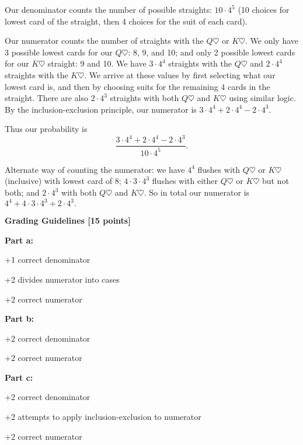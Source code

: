 \documentclass[12pt]{exam}
\begin{document}
\begin{solution}
\begin{qparts}
    \item Our denominator counts the number of possible straights: $10 \cdot 4^5$ (10 choices for lowest card of the straight, then 4 choices for the suit of each card).
    
    Our numerator counts the number of straights with the $Q\heartsuit$ or $K\heartsuit$. We only have 3 possible lowest cards for our $Q\heartsuit$: 8, 9, and 10; and only 2 possible lowest cards for our $K\heartsuit$ straight: 9 and 10. We have $3 \cdot 4^4$ straights with the $Q\heartsuit$ and $2 \cdot 4^4$ straights with the $K\heartsuit$. We arrive at these values by first selecting what our lowest card is, and then by choosing suits for the remaining 4 cards in the straight. There are also $2 \cdot 4^3$ straights with both $Q\heartsuit$ and $K\heartsuit$ using similar logic. By the inclusion-exclusion principle, our numerator is $3\cdot 4^4 + 2 \cdot 4^4 - 2 \cdot 4^3.$
    
    Thus our probability is
    $$\frac{3\cdot 4^4 + 2 \cdot 4^4 - 2 \cdot 4^3}{10 \cdot 4^5}.$$
    
    Alternate way of counting the numerator: we have $4^4$ flushes with $Q\heartsuit$ or $K\heartsuit$ (inclusive) with lowest card of 8; $4 \cdot 3 \cdot 4^3$ flushes with either $Q\heartsuit$ or $K\heartsuit$ but not both; and $2 \cdot 4^3$ with both $Q\heartsuit$ and $K\heartsuit.$ So in total our numerator is $4^4 + 4 \cdot 3 \cdot 4^3 + 2 \cdot 4^3.$ 
\end{qparts}

\textbf{Grading Guidelines [15 points]}

\textbf{Part a:}
\begin{gwguidelines}
    \item +1 correct denominator
    \item +2 divides numerator into cases
    \item +2 correct numerator
\end{gwguidelines}
\textbf{Part b:}
\begin{gwguidelines}[resume]
    \item +2 correct denominator
    \item +2 correct numerator
\end{gwguidelines}
\textbf{Part c:}
\begin{gwguidelines}[resume]
    \item +2 correct denominator
    \item +2 attempts to apply inclusion-exclusion to numerator
    \item +2 correct numerator
\end{gwguidelines}
\end{solution}
\end{document}
